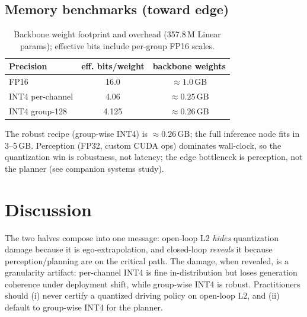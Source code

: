 \documentclass[conference]{IEEEtran}
\begin{document}
\subsection{Memory benchmarks (toward edge)}
\begin{table}[t]\centering
\caption{Backbone weight footprint and overhead (357.8\,M Linear params); effective bits include
per-group FP16 scales.}
\begin{tabular}{lcc}
\toprule
Precision & eff. bits/weight & backbone weights \\
\midrule
FP16 & 16.0 & $\approx 1.0$\,GB \\
INT4 per-channel & 4.06 & $\approx 0.25$\,GB \\
INT4 group-128 & 4.125 & $\approx 0.26$\,GB \\
\bottomrule
\end{tabular}
\end{table}
The robust recipe (group-wise INT4) is $\approx 0.26$\,GB; the full inference node fits in
$3$--$5$\,GB. Perception (FP32, custom CUDA ops) dominates wall-clock, so the quantization win is
robustness, not latency; the edge bottleneck is perception, not the planner (see companion systems
study).

\section{Discussion}
The two halves compose into one message: open-loop L2 \emph{hides} quantization damage because it is
ego-extrapolation, and closed-loop \emph{reveals} it because perception/planning are on the critical
path. The damage, when revealed, is a granularity artifact: per-channel INT4 is fine in-distribution
but loses generation coherence under deployment shift, while group-wise INT4 is robust. Practitioners
should (i) never certify a quantized driving policy on open-loop L2, and (ii) default to group-wise
INT4 for the planner.
\end{document}
